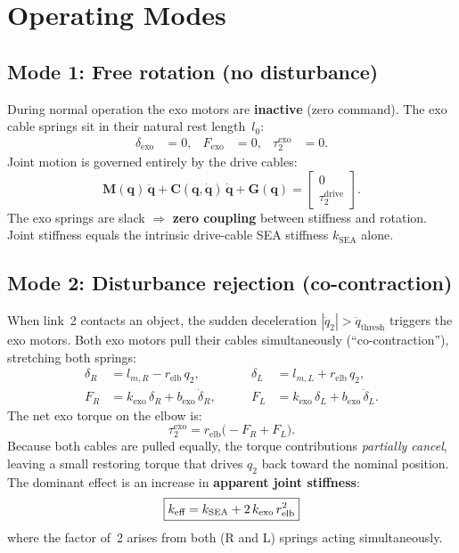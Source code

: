 \documentclass[11pt, a4paper]{article}
\newcommand{\bq}{\bm{q}}
\newcommand{\bM}{\bm{M}}
\newcommand{\bC}{\bm{C}}
\newcommand{\bG}{\bm{G}}
\begin{document}
\section{Operating Modes}

\subsection{Mode 1: Free rotation (no disturbance)}

During normal operation the exo motors are \textbf{inactive} (zero command).
The exo cable springs sit in their natural rest length~$l_0$:
%
\begin{align}
    \delta_{\text{exo}} &= 0, &
    F_{\text{exo}} &= 0, &
    \tau_2^{\text{exo}} &= 0.
\end{align}
%
Joint motion is governed entirely by the drive cables:
%
\begin{equation}
    \bM(\bq)\,\ddot{\bq} + \bC(\bq,\dot{\bq})\,\dot{\bq} + \bG(\bq)
    = \begin{bmatrix} 0 \\ \tau_2^{\text{drive}} \end{bmatrix}.
\end{equation}
%
The exo springs are slack $\Rightarrow$ \textbf{zero coupling} between stiffness
and rotation.  Joint stiffness equals the intrinsic drive-cable SEA stiffness
$k_{\text{SEA}}$ alone.

\subsection{Mode 2: Disturbance rejection (co-contraction)}

When link~2 contacts an object, the sudden deceleration
$|\ddot{q}_2| > \ddot{q}_{\text{thresh}}$ triggers the exo motors.
Both exo motors pull their cables simultaneously
(``co-contraction''), stretching both springs:
%
\begin{align}
    \delta_R &= l_{m,R} - r_{\text{elb}}\,q_2, &
    \delta_L &= l_{m,L} + r_{\text{elb}}\,q_2, \\[4pt]
    F_R &= k_{\text{exo}}\,\delta_R + b_{\text{exo}}\,\dot{\delta}_R, \qquad &
    F_L &= k_{\text{exo}}\,\delta_L + b_{\text{exo}}\,\dot{\delta}_L.
\end{align}
%
The net exo torque on the elbow is:
%
\begin{equation}\label{eq:tau_exo}
    \tau_2^{\text{exo}}
    = r_{\text{elb}}\bigl(-F_R + F_L\bigr).
\end{equation}
%
Because both cables are pulled equally, the torque contributions
\emph{partially cancel}, leaving a small restoring torque that drives $q_2$
back toward the nominal position.  The dominant effect is an increase in
\textbf{apparent joint stiffness}:
%
\begin{equation}\label{eq:stiffness}
    \boxed{%
    k_{\text{eff}}
    = k_{\text{SEA}} + 2\,k_{\text{exo}}\,r_{\text{elb}}^2
    }
\end{equation}
%
where the factor of~2 arises from both (R and L) springs acting
simultaneously.
\end{document}
